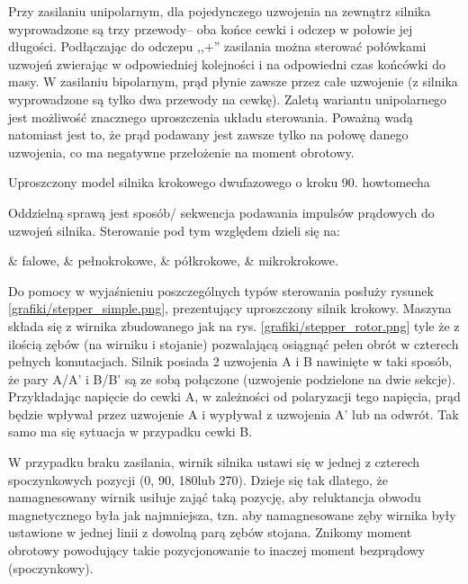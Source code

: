 Przy zasilaniu unipolarnym, dla pojedynczego uzwojenia na zewnątrz silnika wyprowadzone są trzy przewody-- oba końce cewki i odczep w połowie jej długości. Podłączając do odczepu ,,+'' zasilania można sterować połówkami uzwojeń zwierając w odpowiedniej kolejności i na odpowiedni czas końcówki do masy. W zasilaniu bipolarnym, prąd płynie zawsze przez całe uzwojenie (z silnika wyprowadzone są tylko dwa przewody na cewkę). Zaletą wariantu unipolarnego jest możliwość znacznego uproszczenia układu sterowania. Poważną wadą natomiast jest to, że prąd podawany jest zawsze tylko na połowę danego uzwojenia, co ma negatywne przełożenie na moment obrotowy. 

		{Uproszczony model silnika krokowego dwufazowego o kroku 90\degree.}
		{howtomecha}

Oddzielną sprawą jest sposób/ sekwencja podawania impulsów prądowych do uzwojeń silnika. Sterowanie pod tym względem dzieli się na:

\begin{easylist}
	& falowe, 
	& pełnokrokowe, 
	& półkrokowe,
	& mikrokrokowe.
	\\
\end{easylist}

Do pomocy w wyjaśnieniu poszczególnych typów sterowania posłuży rysunek \ref{grafiki/stepper_simple.png}, prezentujący uproszczony silnik krokowy. Maszyna składa się z wirnika zbudowanego jak na rys. \ref{grafiki/stepper_rotor.png} tyle że z ilością zębów (na wirniku i stojanie) pozwalającą osiągnąć pełen obrót w czterech pełnych komutacjach. Silnik posiada 2 uzwojenia A i B nawinięte w taki sposób, że pary A/A' i B/B' są ze sobą połączone (uzwojenie podzielone na dwie sekcje). Przykładając napięcie do cewki A, w zależności od polaryzacji tego napięcia, prąd będzie wpływał przez uzwojenie A i wypływał z uzwojenia A' lub na odwrót. Tak samo ma się sytuacja w przypadku cewki B.


W przypadku braku zasilania, wirnik silnika ustawi się w jednej z czterech spoczynkowych pozycji (0\degree, 90\degree, 180\degree lub 270\degree). Dzieje się tak dlatego, że namagnesowany wirnik usiłuje zająć taką pozycję, aby reluktancja obwodu magnetycznego była jak najmniejsza, tzn. aby namagnesowane zęby wirnika były ustawione w jednej linii z dowolną parą zębów stojana. Znikomy moment obrotowy powodujący takie pozycjonowanie to inaczej moment bezprądowy (spoczynkowy). 

